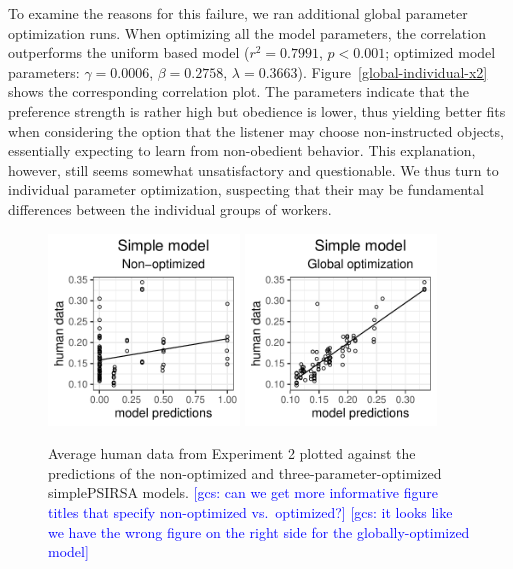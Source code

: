 \documentclass[10pt,a4paper]{article}
\newcommand{\gcs}[1]{\textcolor{blue}{[gcs: #1]}}
\begin{document}
To examine the reasons for this failure, we ran additional global parameter optimization runs.
When optimizing all the model parameters, the correlation outperforms the uniform based model ($r^2=0.7991$, $p<0.001$; optimized model parameters: $\gamma=0.0006$, $\beta=0.2758$, $\lambda=0.3663$).
Figure~\ref{global-individual-x2} shows the corresponding correlation plot. 
The parameters indicate that the preference strength is rather high but obedience is lower, thus yielding better fits when considering the option that the listener may choose non-instructed objects, essentially expecting to learn from non-obedient behavior.
This explanation, however, still seems somewhat unsatisfactory and questionable. 
We thus turn to individual parameter optimization, suspecting that their may be fundamental differences between the individual groups of workers. 




\begin{figure}[ht]
	\centering
	\includegraphics[width=2in]{images/x3_m7.pdf}
	\includegraphics[width=2in]{images/x3_m24.pdf}
	\caption{Average human data from Experiment 2 plotted against the predictions of the non-optimized and three-parameter-optimized simplePSIRSA models. \gcs{can we get more informative figure titles that specify non-optimized vs.~optimized?} \gcs{it looks like we have the wrong figure on the right side for the globally-optimized model} }
	\label{simple-full-x3}
\end{figure}
\end{document}

